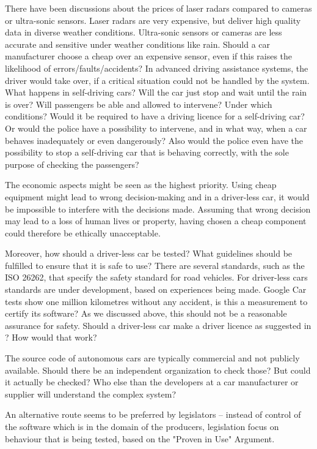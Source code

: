 There have been discussions about the prices of laser radars compared to cameras or ultra-sonic sensors. Laser radars are very expensive, but deliver high quality data in diverse weather conditions. Ultra-sonic sensors or cameras are less accurate and sensitive under weather conditions like rain. 
Should a car manufacturer choose a cheap over an expensive sensor, even if this raises the likelihood of errors/faults/accidents? In advanced driving assistance systems, the driver would take over, if a critical situation could not be handled by the system. What happens in self-driving cars? Will the car just stop and wait until the rain is over? Will passengers be able and allowed to intervene? Under which conditions? Would it be required to have a driving licence for a self-driving car? Or would the police have a possibility to intervene, and in what way, when a car behaves inadequately or even dangerously? Also would the police even have the possibility to stop a self-driving car that is behaving correctly, with the sole purpose of checking the passengers?

The economic aspects might be seen as the highest priority. Using cheap equipment might lead to wrong decision-making and in a driver-less car, it would be impossible to interfere with the decisions made. Assuming that wrong decision may lead to a loss of human lives or property, having chosen a cheap component could therefore be ethically unacceptable.

Moreover, how should a driver-less car be tested? What guidelines should be fulfilled to ensure that it is safe to use? There are several standards, such as the ISO 26262, that specify the safety standard for road vehicles. For driver-less cars standards are under development, based on experiences being made. 
Google Car tests show one million kilometres without any accident, is this a measurement to certify its software? As we discussed above, this should not be a reasonable assurance for safety. Should a driver-less car make a driver licence as suggested in \cite{McBride:2016:EDC:2874239.2874265}? How would that work? 

The source code of autonomous cars are typically commercial and not publicly available. Should there be an independent organization to check those? But could it actually be checked? Who else than the developers at a car manufacturer or supplier will understand the complex system? 

An alternative route seems to be preferred by legislators – instead of control of the software which is in the domain of the producers, legislation focus on behaviour that is being tested, based on the "Proven in Use" Argument. %

